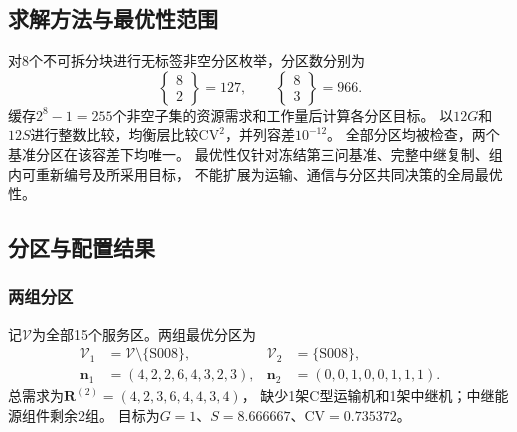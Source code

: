 \documentclass[bwprint]{gmcmthesis}
\begin{document}
\subsection{求解方法与最优性范围}
对8个不可拆分块进行无标签非空分区枚举，分区数分别为
\begin{equation}
\left\{\begin{matrix}8\\2\end{matrix}\right\}=127,
\qquad
\left\{\begin{matrix}8\\3\end{matrix}\right\}=966.
\end{equation}
缓存$2^8-1=255$个非空子集的资源需求和工作量后计算各分区目标。
以$12G$和$12S$进行整数比较，均衡层比较$\mathrm{CV}^2$，并列容差$10^{-12}$。
全部分区均被检查，两个基准分区在该容差下均唯一。
最优性仅针对冻结第三问基准、完整中继复制、组内可重新编号及所采用目标，
不能扩展为运输、通信与分区共同决策的全局最优性。

\subsection{分区与配置结果}
\subsubsection{两组分区}
记$\mathcal V$为全部15个服务区。两组最优分区为
\begin{align}
\mathcal V_1&=\mathcal V\setminus\{\mathrm{S008}\},&
\mathcal V_2&=\{\mathrm{S008}\},\\
\boldsymbol n_1&=(4,2,2,6,4,3,2,3),&
\boldsymbol n_2&=(0,0,1,0,0,1,1,1).
\end{align}
总需求为$\boldsymbol R^{(2)}=(4,2,3,6,4,4,3,4)$，
缺少1架C型运输机和1架中继机；中继能源组件剩余2组。
目标为$G=1$、$S=8.666667$、$\mathrm{CV}=0.735372$。
\end{document}
